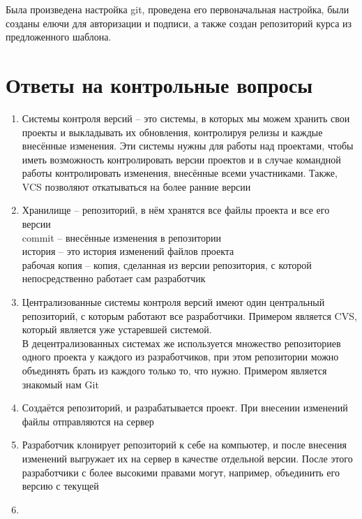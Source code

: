 \documentclass[
  12pt,
  a4paper,
  DIV=11,
  numbers=noendperiod]{scrreprt}
\providecommand{\tightlist}{%
  \setlength{\itemsep}{0pt}\setlength{\parskip}{0pt}}\usepackage{longtable,booktabs,array}
\begin{document}
Была произведена настройка git, проведена его первоначальная настройка,
были созданы елючи для авторизации и подписи, а также создан репозиторий
курса из предложенного шаблона.

\chapter{Ответы на контрольные
вопросы}\label{ux43eux442ux432ux435ux442ux44b-ux43dux430-ux43aux43eux43dux442ux440ux43eux43bux44cux43dux44bux435-ux432ux43eux43fux440ux43eux441ux44b}

\begin{enumerate}
\def\labelenumi{\arabic{enumi}.}
\tightlist
\item
  Системы контроля версий -- это системы, в которых мы можем хранить
  свои проекты и выкладывать их обновления, контролируя релизы и каждые
  внесённые изменения. Эти системы нужны для работы над проектами, чтобы
  иметь возможность контролировать версии проектов и в случае командной
  работы контролировать изменения, внесённые всеми участниками. Также,
  VCS позволяют откатываться на более ранние версии
\item
  Хранилище -- репозиторий, в нём хранятся все файлы проекта и все его
  версии\\
  commit -- внесённые изменения в репозитории\\
  история -- это история изменений файлов проекта\\
  рабочая копия -- копия, сделанная из версии репозитория, с которой
  непосредственно работает сам разработчик
\item
  Централизованные системы контроля версий имеют один центральный
  репозиторий, с которым работают все разработчики. Примером является
  CVS, который является уже устаревшей системой.\\
  В децентрализованных системах же используется множество репозиториев
  одного проекта у каждого из разработчиков, при этом репозитории можно
  объединять брать из каждого только то, что нужно. Примером является
  знакомый нам Git
\item
  Создаётся репозиторий, и разрабатывается проект. При внесении
  изменений файлы отправляются на сервер
\item
  Разработчик клонирует репозиторий к себе на компьютер, и после
  внесения изменений выгружает их на сервер в качестве отдельной версии.
  После этого разработчики с более высокими правами могут, например,
  объединить его версию с текущей
\item

\end{enumerate}
\end{document}
